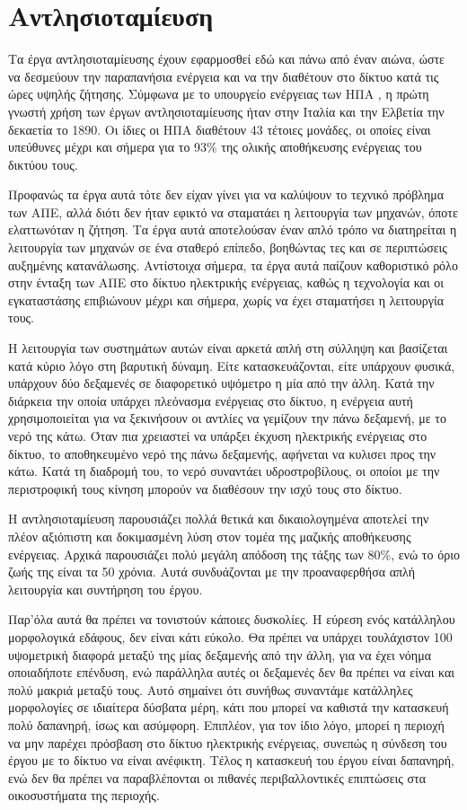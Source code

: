 \documentclass[12pt]{report}
\begin{document}
\section{Αντλησιοταμίευση}
Τα έργα αντλησιοταμίευσης έχουν εφαρμοσθεί εδώ και πάνω από έναν αιώνα, ώστε να δεσμεύουν την παραπανήσια ενέργεια και να την διαθέτουν στο δίκτυο κατά τις ώρες υψηλής ζήτησης. 
Σύμφωνα με το υπουργείο ενέργειας των ΗΠΑ \parencite{energygov1801}, η πρώτη γνωστή χρήση των έργων αντλησιοταμίευσης ήταν στην Ιταλία και την Ελβετία την δεκαετία το 1890. Οι ίδιες οι ΗΠΑ διαθέτουν 43 τέτοιες μονάδες, οι
οποίες είναι υπεύθυνες μέχρι και σήμερα για το 93\% της ολικής αποθήκευσης ενέργειας του δικτύου τους. 

Προφανώς τα έργα αυτά τότε δεν είχαν γίνει για να καλύψουν το τεχνικό πρόβλημα των ΑΠΕ, αλλά διότι δεν ήταν εφικτό να
σταματάει η λειτουργία των μηχανών, όποτε ελαττωνόταν η ζήτηση. Τα έργα αυτά αποτελούσαν έναν απλό τρόπο να διατηρείται η λειτουργία των μηχανών σε ένα σταθερό επίπεδο, βοηθώντας τες και σε περιπτώσεις αυξημένης κατανάλωσης.
Αντίστοιχα σήμερα, τα έργα αυτά παίζουν καθοριστικό ρόλο στην ένταξη των ΑΠΕ στο δίκτυο ηλεκτρικής ενέργειας, καθώς η τεχνολογία και οι εγκαταστάσης επιβιώνουν μέχρι και σήμερα, χωρίς να έχει σταματήσει η λειτουργία τους.

Η λειτουργία των συστημάτων αυτών είναι αρκετά απλή στη σύλληψη και βασίζεται κατά κύριο λόγο στη βαρυτική δύναμη. Είτε κατασκευάζονται, είτε υπάρχουν φυσικά, υπάρχουν δύο δεξαμενές σε διαφορετικό υψόμετρο η μία από την άλλη.
Κατά την διάρκεια την οποία υπάρχει πλεόνασμα ενέργειας στο δίκτυο, η ενέργεια αυτή χρησιμοποιείται για να ξεκινήσουν οι αντλίες να γεμίζουν την πάνω δεξαμενή, με το νερό της κάτω. Όταν πια χρειαστεί να υπάρξει έκχυση 
ηλεκτρικής ενέργειας στο δίκτυο, το αποθηκευμένο νερό της πάνω δεξαμενής, αφήνεται να κυλισει προς την κάτω. Κατά τη διαδρομή του, το νερό συναντάει υδροστροβίλους, οι οποίοι με την περιστροφική τους κίνηση μπορούν
να διαθέσουν την ισχύ τους στο δίκτυο. 

Η αντλησιοταμίευση παρουσιάζει πολλά θετικά και δικαιολογημένα αποτελεί την πλέον αξιόπιστη και δοκιμασμένη λύση στον τομέα της μαζικής αποθήκευσης ενέργειας. Αρχικά παρουσιάζει πολύ μεγάλη απόδοση της τάξης των 80\%, 
ενώ το όριο ζωής της είναι τα 50 χρόνια. Αυτά συνδυάζονται με την προαναφερθήσα απλή λειτουργία και συντήρηση του έργου.

Παρ'όλα αυτά θα πρέπει να τονιστούν κάποιες δυσκολίες. Η εύρεση ενός κατάλληλου μορφολογικά εδάφους, δεν είναι κάτι εύκολο. Θα πρέπει να υπάρχει τουλάχιστον 100{} υψομετρική διαφορά μεταξύ της μίας δεξαμενής 
από την άλλη, για να έχει νόημα οποιαδήποτε επένδυση, ενώ παράλληλα αυτές οι δεξαμενές δεν θα πρέπει να είναι και πολύ μακριά μεταξύ τους. Αυτό σημαίνει ότι συνήθως συναντάμε κατάλληλες μορφολογίες σε ιδιαίτερα δύσβατα μέρη, 
κάτι που μπορεί να καθιστά την κατασκευή πολύ δαπανηρή, ίσως και ασύμφορη. Επιπλέον, για τον ίδιο λόγο, μπορεί η περιοχή να μην παρέχει πρόσβαση στο δίκτυο ηλεκτρικής ενέργειας, συνεπώς η σύνδεση του έργου με το δίκτυο να είναι 
ανέφικτη. Τέλος η κατασκευή του έργου είναι δαπανηρή, ενώ δεν θα πρέπει να παραβλέπονται οι πιθανές περιβαλλοντικές επιπτώσεις στα οικοσυστήματα της περιοχής.
\end{document}

